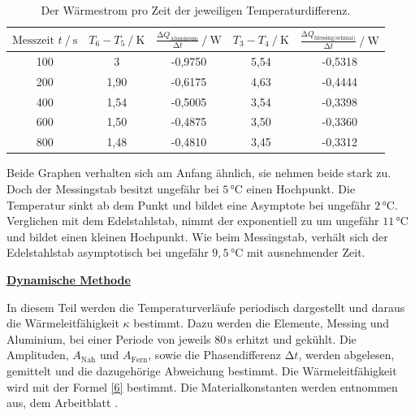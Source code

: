 \begin{table}[H]
    \centering
    \caption{Der Wärmestrom pro Zeit der jeweiligen Temperaturdifferenz.}
    \label{Tabelle2}
    \begin{tabular} {c     c     c     c     c}
        \toprule
        {$ \text{Messzeit}\,\, t \mathbin{/} \unit{\second} $} &
        {$ T_{6} - T_{5} \mathbin{/} \unit{\kelvin}$} &
        {$ \frac{\increment Q_{\text{Aluminium}}}{\increment t}  \mathbin{/} \unit{\watt} $} &
        {$ T_{3} - T_{4}  \mathbin{/} \unit{\kelvin} $} &
        {$ \frac{\increment Q_{\text{Messing(schmal)}}}{\increment t}  \mathbin{/} \unit{\watt} $} \\
        \midrule
        100 & 3    & -0,9750 & 5,54 & -0,5318 \\
        200 & 1,90 & -0,6175 & 4,63 & -0,4444 \\
        400 & 1,54 & -0,5005 & 3,54 & -0,3398 \\
        600 & 1,50 & -0,4875 & 3,50 & -0,3360 \\
        800 & 1,48 & -0,4810 & 3,45 & -0,3312 \\
        \bottomrule
    \end{tabular} 
\end{table}

\begin{flushleft}
    Beide Graphen verhalten sich am Anfang ähnlich, sie nehmen beide stark zu. 
    Doch der Messingstab besitzt ungefähr bei $ 5\,\unit{\degreeCelsius} $ einen Hochpunkt. 
    Die Temperatur sinkt ab dem Punkt und bildet eine Asymptote bei ungefähr $ 2\,\unit{\degreeCelsius} $.
    Verglichen mit dem Edelstahlstab, nimmt der exponentiell zu um ungefähr $ 11\,\unit{\degreeCelsius} $ und bildet einen kleinen Hochpunkt. 
    Wie beim Messingstab, verhält sich der Edelstahlstab asymptotisch bei ungefähr $ 9,5\,\unit{\degreeCelsius} $ mit ausnehmender Zeit.
\end{flushleft}

\vspace{1cm}

\underline{\textbf{Dynamische Methode}}

\begin{flushleft}
    In diesem Teil werden die Temperaturverläufe periodisch dargestellt und daraus die Wärmeleitfähigkeit $\kappa$ bestimmt.
    Dazu werden die Elemente, Messing und Aluminium, bei einer Periode von jeweils $80\,\unit{\second}$ erhitzt und gekühlt.
    Die Amplituden, $A_{\text{Nah}}$ und $A_{\text{Fern}}$, sowie die Phasendifferenz $\increment t$, werden abgelesen, gemittelt und die dazugehörige Abweichung bestimmt.
    Die Wärmeleitfähigkeit wird mit der Formel \ref{6} bestimmt.
    Die Materialkonstanten werden entnommen aus, dem Arbeitblatt \cite{a1}.
\end{flushleft}



